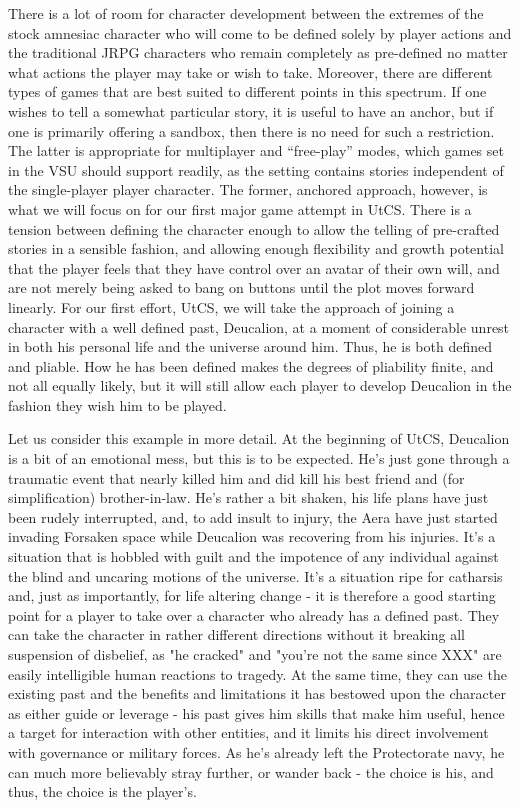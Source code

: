 There is a lot of room for character development between the extremes
of the stock amnesiac character who will come to be defined solely by
player actions and the traditional JRPG characters who remain
completely as pre-defined no matter what actions the player may take
or wish to take. Moreover, there are different types of games that are
best suited to different points in this spectrum. If one wishes to
tell a somewhat particular story, it is useful to have an anchor, but
if one is primarily offering a sandbox, then there is no need for such
a restriction. The latter is appropriate for multiplayer and
``free-play'' modes, which games set in the VSU should support
readily, as the setting contains stories independent of the
single-player player character. The former, anchored approach,
however, is what we will focus on for our first major game attempt in
UtCS. There is a tension between defining the character enough to
allow the telling of pre-crafted stories in a sensible fashion, and
allowing enough flexibility and growth potential that the player feels
that they have control over an avatar of their own will, and are not
merely being asked to bang on buttons until the plot moves forward
linearly. For our first effort, UtCS, we will take the approach of
joining a character with a well defined past, Deucalion, at a moment
of considerable unrest in both his personal life and the universe
around him. Thus, he is both defined and pliable. How he has been
defined makes the degrees of pliability finite, and not all equally
likely, but it will still allow each player to develop Deucalion in
the fashion they wish him to be played.

Let us consider this example in more detail. At the beginning of UtCS,
Deucalion is a bit of an emotional mess, but this is to be
expected. He's just gone through a traumatic event that nearly killed
him and did kill his best friend and (for simplification)
brother-in-law. He's rather a bit shaken, his life plans have just
been rudely interrupted, and, to add insult to injury, the Aera have
just started invading Forsaken space while Deucalion was recovering
from his injuries. It's a situation that is hobbled with guilt and the
impotence of any individual against the blind and uncaring motions of
the universe. It's a situation ripe for catharsis and, just as
importantly, for life altering change - it is therefore a good
starting point for a player to take over a character who already has a
defined past. They can take the character in rather different
directions without it breaking all suspension of disbelief, as "he
cracked" and "you're not the same since XXX" are easily intelligible
human reactions to tragedy. At the same time, they can use the
existing past and the benefits and limitations it has bestowed upon
the character as either guide or leverage - his past gives him skills
that make him useful, hence a target for interaction with other
entities, and it limits his direct involvement with governance or
military forces. As he's already left the Protectorate navy, he can
much more believably stray further, or wander back - the choice is
his, and thus, the choice is the player's.

